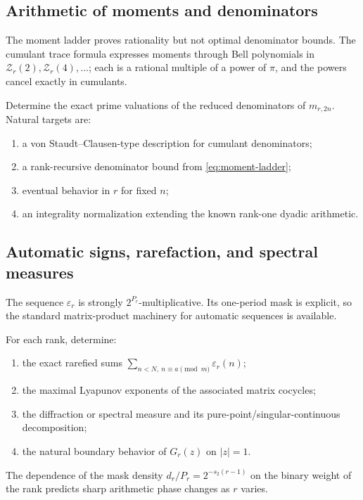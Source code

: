\documentclass[11pt,a4paper]{article}
\theoremstyle{frontier}
\theoremstyle{definition}
\begin{document}
\subsection{Arithmetic of moments and denominators}

The moment ladder proves rationality but not optimal denominator bounds.  The cumulant trace formula expresses moments through Bell polynomials in
$\mathcal Z_r(2),\mathcal Z_r(4),\ldots$; each is a rational multiple of a power of $\pi$, and the powers cancel exactly in cumulants.

\begin{frontierproblem}
Determine the exact prime valuations of the reduced denominators of
$m_{r,2n}$.  Natural targets are:
\begin{enumerate}[label=(\roman*)]
\item a von Staudt--Clausen-type description for cumulant denominators;
\item a rank-recursive denominator bound from \eqref{eq:moment-ladder};
\item eventual behavior in $r$ for fixed $n$;
\item an integrality normalization extending the known rank-one dyadic arithmetic.
\end{enumerate}
\end{frontierproblem}

\subsection{Automatic signs, rarefaction, and spectral measures}

The sequence $\varepsilon_r$ is strongly $2^{P_r}$-multiplicative.  Its one-period mask is explicit, so the standard matrix-product machinery for automatic sequences is available.

\begin{frontierproblem}
For each rank, determine:
\begin{enumerate}[label=(\roman*)]
\item the exact rarefied sums $\sum_{n<N,\ n\equiv a\pmod m}\varepsilon_r(n)$;
\item the maximal Lyapunov exponents of the associated matrix cocycles;
\item the diffraction or spectral measure and its pure-point/singular-continuous decomposition;
\item the natural boundary behavior of $G_r(z)$ on $|z|=1$.
\end{enumerate}
The dependence of the mask density $d_r/P_r=2^{-s_2(r-1)}$ on the binary weight of the rank predicts sharp arithmetic phase changes as $r$ varies.
\end{frontierproblem}
\end{document}
